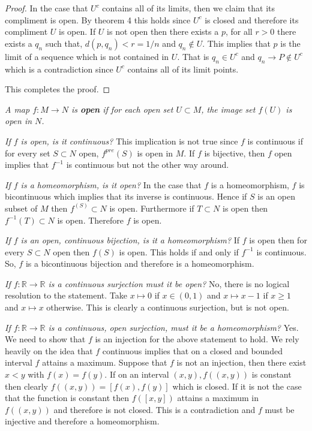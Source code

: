 \documentclass[letter]{article}
\newenvironment{menumerate}{%
  \edef\backupindent{\the\parindent}%
  \enumerate%
  \setlength{\parindent}{\backupindent}%
}{\endenumerate}
\begin{document}
\begin{menumerate}
\begin{proof}
			 In the case that $U^c$ contains all of its limits, then we claim that its compliment is open. By theorem 4 this holds since $U^c$ is closed and therefore its compliment $U$ is open. If $U$ is not open then there exists a $p$, for all $r >0$ there exists a $q_n$ such that, $d(p,q_n) < r=1/n$ and $q_n \notin U.$ This implies that $p$ is the limit of a sequence which is not contained in $U$. That is $q_n \in U^c$ and $q_n \to P \notin U^c$ which is a contradiction since $U^c$ contains all of its limit points. 

			 This completes the proof.
			 \end{proof}
		 \setcounter{enumi}{27}
		 \item \emph{A map $f: M \to N$ is \textbf{open} if for each open set $U\subset M$, the image set $f(U)$ is open in $N$. }
		 	\begin{menumerate}
		 		\item \emph{If $f$ is open, is it continuous?} This implication is not true since $f$ is continuous if for every set $S \subset N$ open, $f^{pre}(S)$ is open in $M$. If $f$ is bijective, then $f$ open implies that $f^{-1}$ is continuous but not the other way around.
		 		\item \emph{If $f$ is a homeomorphism, is it open?} In the case that $f$ is a homeomorphism, $f$ is bicontinuous which implies that its inverse is continuous. Hence if $S$ is an open subset of $M$ then $f^(S)\subset N$ is open. Furthermore if $T \subset N$ is open then $f^{-1}(T) \subset N$ is open. Therefore $f$ is open.
		 		\item \emph{If $f$ is an open, continuous bijection, is it a homeomorphism?}  If $f$ is open then for every $S\subset N$ open then $f(S)$ is open. This holds if and only if $f^{-1}$ is continuous. So, $f$ is a bicontinuous bijection and therefore is a homeomorphism.
		 		\item \emph{If $f: \mathbb{R} \to \mathbb{R}$ is a continuous surjection must it be open?} No, there is no logical resolution to the statement. Take $x\mapsto 0$ if $x \in (0,1)$ and $x\mapsto x -1$ if $x \geq 1$ and $x \mapsto x$ otherwise. This is clearly a continuous surjection, but is not open. 
		 		\item \emph{If $f:\mathbb{R} \to \mathbb{R}$ is a continuous, open surjection, must it be a homeomorphism?} Yes. We need to show that $f$ is an injection for the above statement to hold. We rely heavily on the idea that $f$ continuous implies that on a closed and bounded interval $f$ attains a maximum. Suppose that $f$ is not an injection, then there exist $x <y$ with $f(x) = f(y).$ If on an interval $(x,y), f((x,y))$ is constant then clearly $f((x,y)) = [f(x),f(y)]$ which is closed. If it is not the case that the function is constant then $f([x,y])$ attains a maximum in $f((x,y))$ and therefore is not closed. This is a contradiction and $f$ must be injective and therefore a homeomorphism.

\end{menumerate}
\end{menumerate}
\end{document}
